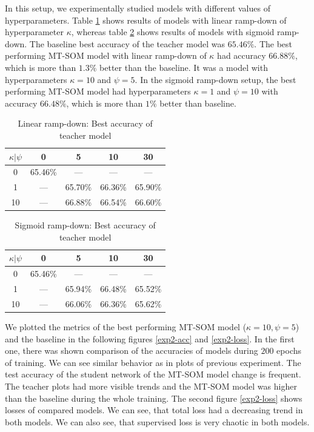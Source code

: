 In this setup, we experimentally studied models with different values of hyperparameters. Table \ref{exp2-tab-lin} shows results of models with linear ramp-down of hyperparameter $\kappa$, whereas table \ref{exp2-tab-sigm} shows results of models with sigmoid ramp-down. The baseline best accuracy of the teacher model was $65.46\%$. 
The best performing MT-SOM model with linear ramp-down of $\kappa$ had accuracy $66.88\%$, which is more than $1.3\%$ better than the baseline. It was a model with hyperparameters  $\kappa=10$ and $\psi=5$. In the sigmoid ramp-down setup, the best performing MT-SOM model had hyperparameters $\kappa=1$ and $\psi=10$ with accuracy $66.48\%$, which is more than $1\%$ better than baseline.

\begin{table}[h]
\centering
\begin{tabular}{|c|c|c|c|c|}
\hline
$\kappa | \psi$ & 0    & 5       & 10      & 30      \\ \hline
0           & 65.46\%   & ---     & ---     & ---     \\ \hline
1           & ---   & 65.70\%     & 66.36\%     & 65.90\%     \\ \hline
10          & ---   & \color{purple} 66.88\% &  66.54\% & \color{purple} 66.60\%  \\ \hline

\end{tabular}
\caption{Linear ramp-down: Best accuracy of teacher model}
\label{exp2-tab-lin}
\end{table}


\begin{table}[h]
\centering
\begin{tabular}{|c|c|c|c|c|}
\hline
$\kappa | \psi$ & 0    & 5       & 10      & 30      \\ \hline
0           & 65.46\%   & ---     & ---     & ---     \\ \hline
1           & ---   & 65.94\%     & \color{purple} 66.48\%     & 65.52\%     \\ \hline
10          & ---   & 66.06\% & \color{purple} 66.36\% & 65.62\%  \\ \hline

\end{tabular}
\caption{Sigmoid ramp-down: Best accuracy of teacher model}
\label{exp2-tab-sigm}
\end{table}

We plotted the metrics of the best performing MT-SOM model ($\kappa=10, \psi=5$) and the baseline in the following figures \ref{exp2-acc} and \ref{exp2-loss}. In the first one, there was shown comparison of the accuracies of models during $200$ epochs of training. We can see similar behavior as in plots of previous experiment. The test accuracy of the student network of the MT-SOM model change is frequent. The teacher plots had more visible trends and the MT-SOM model was higher than the baseline during the whole training. The second figure \ref{exp2-loss} shows losses of compared models. We can see, that total loss had a decreasing trend in both models. We can also see, that supervised loss is very chaotic in both models.


